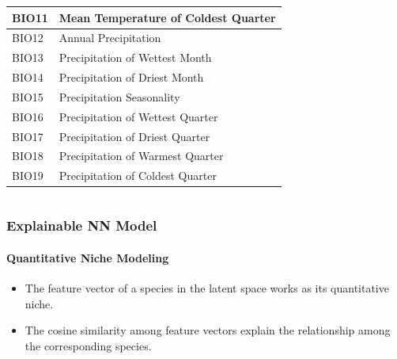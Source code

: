 \documentclass[handout]{beamer}
\begin{document}
{\begin{columns}[T]
\begin{column}{4.5cm}
\begin{table}[]
\begin{tabular}{l|l}
                BIO11 & Mean Temperature of Coldest Quarter \\ \hline
                BIO12 & Annual Precipitation \\ \hline
                BIO13 & Precipitation of Wettest Month \\ \hline
                BIO14 & Precipitation of Driest Month \\ \hline
                BIO15 & Precipitation Seasonality\\ \hline
                BIO16 & Precipitation of Wettest Quarter \\ \hline
                BIO17 & Precipitation of Driest Quarter \\ \hline
                BIO18 & Precipitation of Warmest Quarter\\ \hline
                BIO19 & Precipitation of Coldest Quarter \\ \hline
                \end{tabular}
            \end{table}
        \end{column}
    \end{columns}
}

\begin{frame}[t]
    \frametitle{Explainable NN Model}
    \framesubtitle{Quantitative Niche Modeling}
    \begin{itemize}
        \item The feature vector of a species in the latent space works as its quantitative niche. 
        \item The cosine similarity among feature vectors explain the relationship among the corresponding species.  %
    \end{itemize}
    \vspace{0.2cm}
\end{frame}
\end{document}
